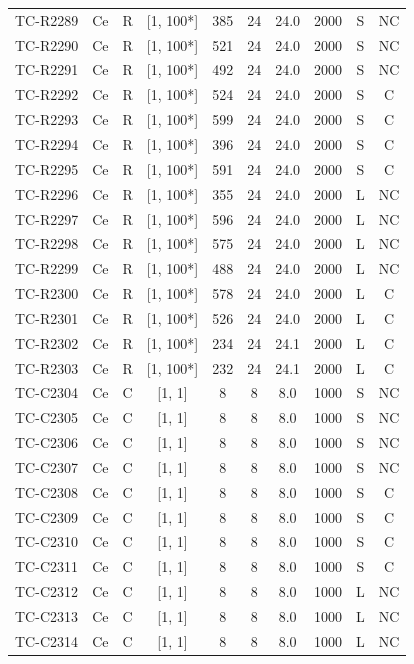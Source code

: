 \begin{longtable}{lccccccccc}
TC-R2289 & Ce & R & [1, 100*] & 385 & 24 & 24.0 & 2000 & S & NC \\
TC-R2290 & Ce & R & [1, 100*] & 521 & 24 & 24.0 & 2000 & S & NC \\
TC-R2291 & Ce & R & [1, 100*] & 492 & 24 & 24.0 & 2000 & S & NC \\
TC-R2292 & Ce & R & [1, 100*] & 524 & 24 & 24.0 & 2000 & S & C \\
TC-R2293 & Ce & R & [1, 100*] & 599 & 24 & 24.0 & 2000 & S & C \\
TC-R2294 & Ce & R & [1, 100*] & 396 & 24 & 24.0 & 2000 & S & C \\
TC-R2295 & Ce & R & [1, 100*] & 591 & 24 & 24.0 & 2000 & S & C \\
TC-R2296 & Ce & R & [1, 100*] & 355 & 24 & 24.0 & 2000 & L & NC \\
TC-R2297 & Ce & R & [1, 100*] & 596 & 24 & 24.0 & 2000 & L & NC \\
TC-R2298 & Ce & R & [1, 100*] & 575 & 24 & 24.0 & 2000 & L & NC \\
TC-R2299 & Ce & R & [1, 100*] & 488 & 24 & 24.0 & 2000 & L & NC \\
TC-R2300 & Ce & R & [1, 100*] & 578 & 24 & 24.0 & 2000 & L & C \\
TC-R2301 & Ce & R & [1, 100*] & 526 & 24 & 24.0 & 2000 & L & C \\
TC-R2302 & Ce & R & [1, 100*] & 234 & 24 & 24.1 & 2000 & L & C \\
TC-R2303 & Ce & R & [1, 100*] & 232 & 24 & 24.1 & 2000 & L & C \\
TC-C2304 & Ce & C & [1, 1] & 8 & 8 & 8.0 & 1000 & S & NC \\
TC-C2305 & Ce & C & [1, 1] & 8 & 8 & 8.0 & 1000 & S & NC \\
TC-C2306 & Ce & C & [1, 1] & 8 & 8 & 8.0 & 1000 & S & NC \\
TC-C2307 & Ce & C & [1, 1] & 8 & 8 & 8.0 & 1000 & S & NC \\
TC-C2308 & Ce & C & [1, 1] & 8 & 8 & 8.0 & 1000 & S & C \\
TC-C2309 & Ce & C & [1, 1] & 8 & 8 & 8.0 & 1000 & S & C \\
TC-C2310 & Ce & C & [1, 1] & 8 & 8 & 8.0 & 1000 & S & C \\
TC-C2311 & Ce & C & [1, 1] & 8 & 8 & 8.0 & 1000 & S & C \\
TC-C2312 & Ce & C & [1, 1] & 8 & 8 & 8.0 & 1000 & L & NC \\
TC-C2313 & Ce & C & [1, 1] & 8 & 8 & 8.0 & 1000 & L & NC \\
TC-C2314 & Ce & C & [1, 1] & 8 & 8 & 8.0 & 1000 & L & NC \\

\end{longtable}
